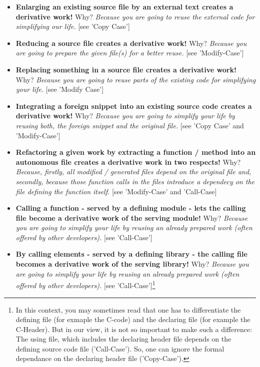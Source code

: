 {\begin{itemize}
  \item \textbf{Enlarging an existing source file by an external text creates a
  derivative work!} Why? \emph{Because you are going to reuse the
  external code for simplifying our life.} [see 'Copy Case']
  \item \textbf{Reducing a source file creates a derivative work!} Why?
  \emph{Because you are going to prepare the given file(s) for a better reuse.}
  [see 'Modify-Case']
  \item \textbf{Replacing something in a source file creates a derivative work!}
  Why? \emph{Because you are going to reuse parts of the existing code for
  simplifying your life.} [see 'Modify Case']
  \item \textbf{Integrating a foreign snippet into an existing source code
  creates a derivative work!} Why? \emph{Because you are going to simplify
  your life by reusing both, the foreign snippet and the original file.} [see
  'Copy Case' and 'Modify-Case']
  \item \textbf{Refactoring a given work by extracting a function / method into
  an autonomous file creates a derivative work in two respects!} Why?
  \emph{Because, firstly, all modified / generated files depend
  on the original file and, secondly, because those function calls in the files
  introduce a dependecy on the file defining the function itself.}
  [see 'Modify-Case' and 'Call-Case]
  \item \textbf{Calling a function - served by a defining module - lets the
  calling file become a derivative work of the serving module!} Why?
  \emph{Because you are going to simplify your life by reusing an already
  prepared work (often offered by other developers).} [see 'Call-Case']
  \item \textbf{By calling elements - served by a defining library - the
  calling file becomes a derivative work of the serving library!} Why? 
  \emph{Because you are going to simplify your life by reusing an already
  prepared work (often offered by other developers).} [see
  'Call-Case']\footnote{In this context, you may sometimes read that one has to
  differentiate the defining file (for exmaple the C-code) and the declaring
  file (for example the C-Header). But in our view, it is not so important to
  make such a difference: The using file, which includes the declaring header
  file depends on the defining source code file ('Call-Case'). So, one can
  ignore the formal dependance on the declaring header file ('Copy-Case').}
\end{itemize}

}
